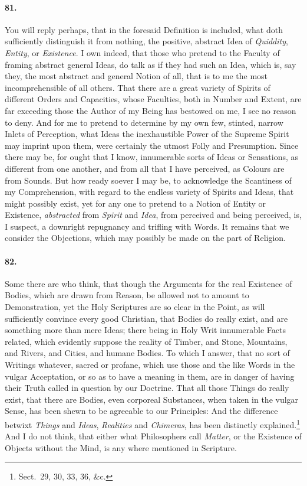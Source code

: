 \documentclass[]{article}
\newcounter{authornote}[page]
\newcommand*{\authornote}[1]{\renewcommand{\thefootnote}{\fnsymbol{footnote}}\stepcounter{authornote}\footnote[\value{authornote}]{#1}\renewcommand{\thefootnote}{\arabic{footnote}}}
\newenvironment{sectionbody}{}{}
\begin{document}
\begin{sectionbody}
\paragraph{81.} You will reply perhaps, that in the foresaid Definition is
included, what doth sufficiently distinguish it from nothing, the
positive, abstract Idea of \emph{Quiddity}, \emph{Entity}, or
\emph{Existence}.  I own indeed, that those who pretend to the
Faculty of framing abstract general Ideas, do talk as if they had
such an Idea, which is, say they, the most abstract and general
Notion of all, that is to me the most incomprehensible of all
others.  That there are a great variety of Spirits of different
Orders and Capacities, whose Faculties, both in Number and
Extent, are far exceeding those the Author of my Being has
bestowed on me, I see no reason to deny.  And for me to pretend
to determine by my own few, stinted, narrow Inlets of Perception,
what Ideas the inexhaustible Power of the {\sc Supreme Spirit} may
imprint upon them, were certainly the utmost Folly and
Presumption.  Since there may be, for ought that I know,
innumerable sorts of Ideas or Sensations, as different from one
another, and from all that I have perceived, as Colours are from
Sounds.  But how ready soever I may be, to acknowledge the
Scantiness of my Comprehension, with regard to the endless
variety of Spirits and Ideas, that might possibly exist, yet for
any one to pretend to a Notion of Entity or Existence,
\emph{abstracted} from \emph{Spirit} and \emph{Idea}, from
perceived and being perceived, is, I suspect, a downright
repugnancy and trifling with Words.  It remains that we consider
the Objections, which may possibly be made on the part of
Religion.



\paragraph{82.} Some there are who think, that though the Arguments for the real
Existence of Bodies, which are drawn from Reason, be allowed not
to amount to Demonstration, yet the Holy Scriptures are so clear
in the Point, as will sufficiently convince every good Christian,
that Bodies do really exist, and are something more than mere
Ideas; there being in Holy Writ innumerable Facts related, which
evidently suppose the reality of Timber, and Stone, Mountains,
and Rivers, and Cities, and humane Bodies.  To which I answer,
that no sort of Writings whatever, sacred or profane, which use
those and the like Words in the vulgar Acceptation, or so as to
have a meaning in them, are in danger of having their Truth
called in question by our Doctrine.  That all those Things do
really exist, that there are Bodies, even corporeal Substances,
when taken in the vulgar Sense, has been shewn to be agreeable to
our Principles: And the difference betwixt \emph{Things} and
\emph{Ideas}, \emph{Realities} and \emph{Chimeras}, has
been distinctly explained.\authornote{Sect.\ 29, 30, 33, 36, \&c.}
And I do not think, that either what Philosophers call
\emph{Matter}, or the Existence of Objects without the Mind, is
any where mentioned in Scripture.




\end{sectionbody}
\end{document}
